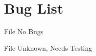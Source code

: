 \chapter{Bug List}
\hypertarget{bug}{}\label{bug}

\begin{DoxyRefList}
\item[File \doxylink{cache__predictor_8h}{cache\+\_\+predictor.h} ]\label{bug__bug000001}%
%
No Bugs 


\item[File \doxylink{var_int_file___i_o_8h}{var\+Int\+File\+\_\+\+IO.h} ]\label{bug__bug000002}%
%
Unknown, Needs Testing 
\end{DoxyRefList}